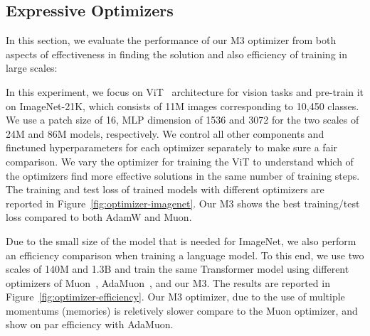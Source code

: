\subsection{Expressive Optimizers}\label{sec:exp-deep-optimizer}
In this section, we evaluate the performance of our M3 optimizer from both aspects of effectiveness in finding the solution and also efficiency of training in large scales:

 In this experiment, we focus on ViT~\citep{dosovitskiy2021an} architecture for vision tasks and pre-train it on ImageNet-21K, which consists of 11M images corresponding to 10,450 classes. We use a patch size of 16, MLP dimension of 1536 and 3072 for the two scales of 24M and 86M models, respectively. We control all other components and finetuned hyperparameters for each optimizer separately to make sure a fair comparison. We vary the optimizer for training the ViT to understand which of the optimizers find more effective solutions in the same number of training steps. The training and test loss of trained models with different optimizers are reported in Figure~\ref{fig:optimizer-imagenet}. Our M3 shows the best training/test loss compared to both AdamW and Muon. 




 Due to the small size of the model that is needed for ImageNet, we also perform an efficiency comparison when training a language model. To this end, we use two scales of 140M and 1.3B and train the same Transformer model using different optimizers of Muon~\citep{jordanmuon}, AdaMuon~\citep{si2025adamuon}, and our M3. The results are reported in Figure~\ref{fig:optimizer-efficiency}. Our M3 optimizer, due to the use of multiple momentums (memories) is reletively slower compare to the Muon optimizer, and show on par efficiency with AdaMuon.  





